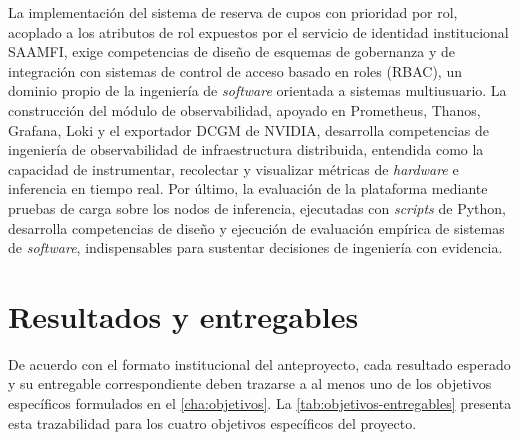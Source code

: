 La implementación del sistema de reserva de cupos con prioridad por rol, acoplado a los atributos de rol expuestos por el servicio de identidad institucional SAAMFI, exige competencias de diseño de esquemas de gobernanza y de integración con sistemas de control de acceso basado en roles (RBAC), un dominio propio de la ingeniería de \emph{software} orientada a sistemas multiusuario. La construcción del módulo de observabilidad, apoyado en Prometheus, Thanos, Grafana, Loki y el exportador DCGM de NVIDIA, desarrolla competencias de ingeniería de observabilidad de infraestructura distribuida, entendida como la capacidad de instrumentar, recolectar y visualizar métricas de \emph{hardware} e inferencia en tiempo real. Por último, la evaluación de la plataforma mediante pruebas de carga sobre los nodos de inferencia, ejecutadas con \emph{scripts} de Python, desarrolla competencias de diseño y ejecución de evaluación empírica de sistemas de \emph{software}, indispensables para sustentar decisiones de ingeniería con evidencia.

\section{Resultados y entregables}

De acuerdo con el formato institucional del anteproyecto, cada resultado esperado y su entregable correspondiente deben trazarse a al menos uno de los objetivos específicos formulados en el \cref{cha:objetivos}. La \cref{tab:objetivos-entregables} presenta esta trazabilidad para los cuatro objetivos específicos del proyecto.

